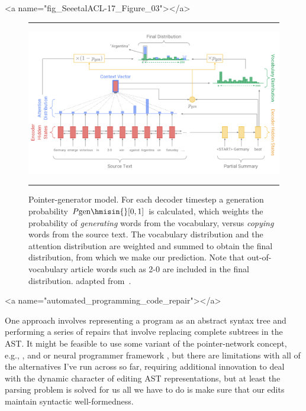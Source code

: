 
\setcounter{figure}{1}


\rawhtml
<a name="fig_SeeetalACL-17_Figure_03"></a>
\endrawhtml
\begin{figure}
%
  \hrule{}
%
  \begin{center}
    \includegraphics[width=11.0in]{./figures/SeeetalACL-17_Figure_03.png}
  \end{center}
%
  \caption{Pointer-generator model. For each decoder timestep a generation probability $P\mbox{\rm{gen}} \hmisin{} [0, 1]$ is calculated, which weights the probability of {\it{generating}} words from the vocabulary, versus {\it{copying}} words from the source text. The vocabulary distribution and the attention distribution are weighted and summed to obtain the final distribution, from which we make our prediction. Note that out-of-vocabulary article words such as 2-0 are included in the final distribution. \emdash{} adapted from~\cite{SeeetalACL-17}.}
%
  \hrule{}
%
\end{figure}


\rawhtml
<a name="automated_programming_code_repair"></a>
\endrawhtml

One approach involves representing a program as an abstract syntax tree and performing a series of repairs that involve replacing complete subtrees in the AST. It might be feasible to use some variant of the pointer-network concept, e.g., {\cite{BhoopchandetalICLR-17}}, {\cite{SeeetalACL-17}} and  {\cite{WangandJiangICLR-17}} or neural programmer framework {\cite{NeelakantanetalICLR-17}}, but there are limitations with all of the alternatives I've run across so far, requiring additional innovation to deal with the dynamic character of editing AST representations, but at least the parsing problem is solved for us \emdash{} all we have to do is make sure that our edits maintain syntactic well-formedness.

